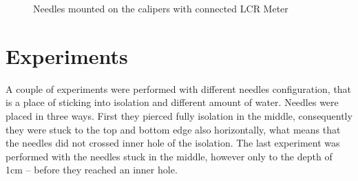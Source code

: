 \documentclass[a4paper, keeplastbox]{jacow}
\begin{document}
\begin{figure}[H]
	\begin{center}
	\end{center}
	\caption{Needles mounted on the calipers with connected LCR Meter}
	\label{rys:needles}
\end{figure}

\section{Experiments}
A couple of experiments were performed with different needles configuration, that is a place of sticking into isolation and different amount of water. 
Needles were placed in three ways. First they pierced fully isolation in the middle, consequently they were stuck to the top and bottom edge also horizontally, what means that the needles did not crossed inner hole of the isolation. The last experiment was performed with the needles stuck in the middle, however only to the depth of 1cm -- before they reached an inner hole. 
\end{document}

